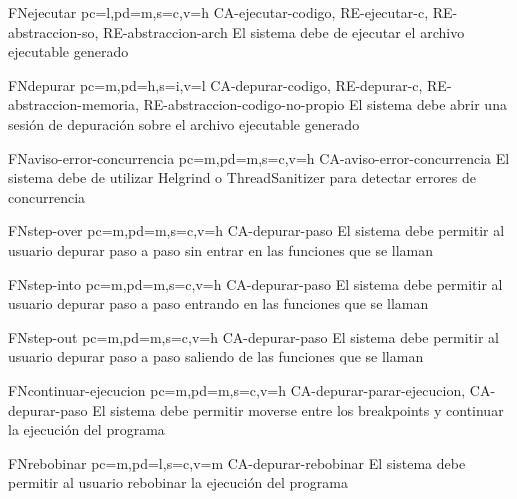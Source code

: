 \begin{softwareReq}{FN}{ejecutar}
    {pc=l,pd=m,s=c,v=h}
    {CA-ejecutar-codigo, RE-ejecutar-c, RE-abstraccion-so, RE-abstraccion-arch}
    El sistema debe de ejecutar el archivo ejecutable generado
\end{softwareReq}

\begin{softwareReq}{FN}{depurar}
    {pc=m,pd=h,s=i,v=l}
    {CA-depurar-codigo, RE-depurar-c, RE-abstraccion-memoria, RE-abstraccion-codigo-no-propio}
    El sistema debe abrir una sesión de depuración sobre el archivo ejecutable generado
\end{softwareReq}

\begin{softwareReq}{FN}{aviso-error-concurrencia}
    {pc=m,pd=m,s=c,v=h}
    {CA-aviso-error-concurrencia}
    El sistema debe de utilizar Helgrind o ThreadSanitizer para detectar errores de concurrencia
\end{softwareReq}

\begin{softwareReq}{FN}{step-over}
    {pc=m,pd=m,s=c,v=h}
    {CA-depurar-paso}
    El sistema debe permitir al usuario depurar paso a paso sin entrar en las funciones que se llaman
\end{softwareReq}

\begin{softwareReq}{FN}{step-into}
    {pc=m,pd=m,s=c,v=h}
    {CA-depurar-paso}
    El sistema debe permitir al usuario depurar paso a paso entrando en las funciones que se llaman
\end{softwareReq}

\begin{softwareReq}{FN}{step-out}
    {pc=m,pd=m,s=c,v=h}
    {CA-depurar-paso}
    El sistema debe permitir al usuario depurar paso a paso saliendo de las funciones que se llaman
\end{softwareReq}

\begin{softwareReq}{FN}{continuar-ejecucion}
    {pc=m,pd=m,s=c,v=h}
    {CA-depurar-parar-ejecucion, CA-depurar-paso}
    El sistema debe permitir moverse entre los breakpoints y continuar la ejecución del programa
\end{softwareReq}

\begin{softwareReq}{FN}{rebobinar}
    {pc=m,pd=l,s=c,v=m}
    {CA-depurar-rebobinar}
    El sistema debe permitir al usuario rebobinar la ejecución del programa
\end{softwareReq}

